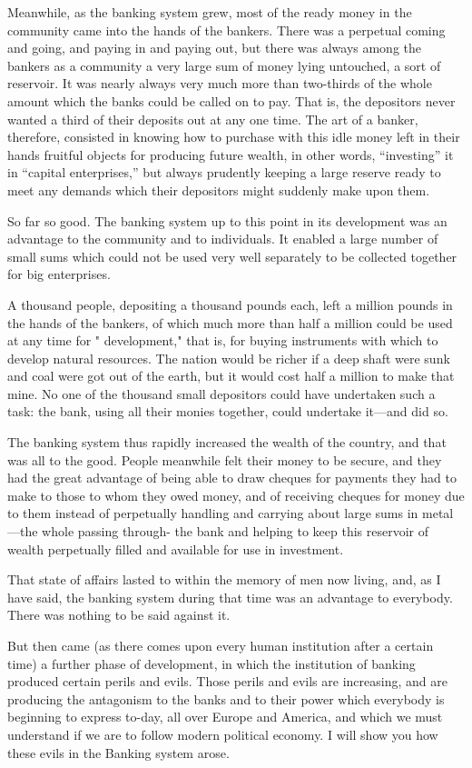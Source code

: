 \documentclass{book}
\begin{document}
Meanwhile, as the banking system grew, most of the ready money in the community came into the hands of the bankers. There was a perpetual coming and going, and paying in and paying out, but there was always among the bankers as a community a very large sum of money lying untouched, a sort of reservoir. It was nearly always very much more than two-thirds of the whole amount which the banks could be called on to pay. That is, the depositors never wanted a third of their deposits out at any one time. The art of a banker, therefore, consisted in knowing how to purchase with this idle money left in their hands fruitful objects for producing future wealth, in other words, “investing” it in “capital enterprises,” but always prudently keeping a large reserve ready to meet any demands which their depositors might suddenly make upon them.

So far so good. The banking system up to this point in its development was an advantage to the community and to individuals. It enabled a large number of small sums which could not be used very well separately to be collected together for big enterprises.

A thousand people, depositing a thousand pounds each, left a million pounds in the hands of the bankers, of which much more than half a million could be used at any time for " development," that is, for buying instruments with which to develop natural resources. The nation would be richer if a deep shaft were sunk and coal were got out of the earth, but it would cost half a million to make that mine. No one of the thousand small depositors could have undertaken such a task: the bank, using all their monies together, could undertake it—and did so.

The banking system thus rapidly increased the wealth of the country, and that was all to the good. People meanwhile felt their money to be secure, and they had the great advantage of being able to draw cheques for payments they had to make to those to whom they owed money, and of receiving cheques for money due to them instead of perpetually handling and carrying about large sums in metal—the whole passing through- the bank and helping to keep this reservoir of wealth perpetually filled and available for use in investment.

That state of affairs lasted to within the memory of men now living, and, as I have said, the banking system during that time was an advantage to everybody. There was nothing to be said against it.

But then came (as there comes upon every human institution after a certain time) a further phase of development, in which the institution of banking produced certain perils and evils. Those perils and evils are increasing, and are producing the antagonism to the banks and to their power which everybody is beginning to express to-day, all over Europe and America, and which we must understand if we are to follow modern political economy. I will show you how these evils in the Banking system arose.
\end{document}
